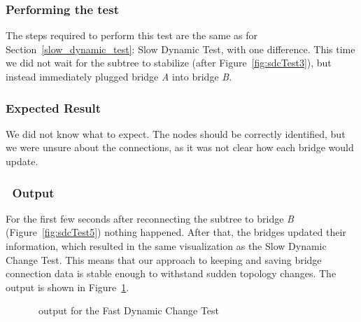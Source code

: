 \subsubsection*{Performing the test}
The steps required to perform this test are the same as for Section~\ref{slow_dynamic_test}: Slow Dynamic Test, with one difference.
This time we did not wait for the subtree to stabilize (after Figure~\ref{fig:sdcTest3}), but instead immediately plugged bridge \textit{A} into bridge \textit{B}.

\subsubsection*{Expected Result}
We did not know what to expect.
The nodes should be correctly identified, but we were unsure about the connections, as it was not clear how each bridge would update.

\subsubsection*{\tool\ Output}
For the first few seconds after reconnecting the subtree to bridge \textit{B} (Figure~\ref{fig:sdcTest5}) nothing happened.
After that, the bridges updated their information, which resulted in the same visualization as the Slow Dynamic Change Test.
This means that our approach to keeping and saving bridge connection data is stable enough to withstand sudden topology changes.
The output is shown in Figure~\ref{fig:fdc}.
\begin{figure}[h]
    \centering
    
    \caption{\tool\ output for the Fast Dynamic Change Test}
    \label{fig:fdc}
\end{figure}

